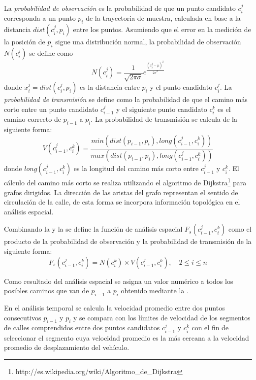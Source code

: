 La \emph{probabilidad de observación} es la probabilidad de que un punto candidato $c_{i}^{j}$ corresponda a un punto $p_i$ de la trayectoria de muestra, calculada en base a la distancia $dist(c_{i}^{j},p_i)$ entre los puntos. Asumiendo que el error en la medición de la posición de $p_i$ sigue una distribución normal, la probabilidad de observación $N(c_{i}^{j})$ se define como
\begin{equation} \label{probabilidad_de_observacion}
N(c_{i}^{j}) = \frac {1}{\sqrt { 2 \pi \sigma }} {e}^{\frac {{(x_{i}^{j} - \mu)}^{2}}{{ 2 \sigma}^{2}}}
\end{equation}
donde $x_{i}^{j} = dist(c_{i}^{j},p_i)$ es la distancia entre $p_i$ y el punto candidato $c_{i}^{j}$. 
La \emph{probabilidad de transmisión} se define como la probabilidad de que el camino más corto entre un punto candidato $c_{i-1}^{j}$ y el siguiente punto candidato $c_{i}^{k}$ es el camino correcto de $p_{i-1}$ a $p_i$. La probabilidad de transmisión se calcula de la siguiente forma: 
\begin{equation} \label{probabilidad_de_transmision}
V(c_{i-1}^{j}, c_{i}^{k}) = \frac { min( dist(p_{i-1}, p_i), long(c_{i-1}^{j}, c_{i}^{k})) }{ max (dist(p_{i-1}, p_i), long(c_{i-1}^{j}, c_{i}^{k})) }
\end{equation}
donde $long(c_{i-1}^{j}, c_{i}^{k})$ es la longitud del camino más corto entre $c_{i-1}^{j}$ y $c_{i}^{k}$. El cálculo del camino más corto se realiza utilizando el algoritmo de Dijkstra\footnote{http://es.wikipedia.org/wiki/Algoritmo\_de\_Dijkstra} para grafos dirigidos. La dirección de las aristas del grafo representan el sentido de circulación de la calle, de esta forma se incorpora información topológica en el análisis espacial.

Combinando la  y la  se define la función de análisis espacial $F_s(c_{i-1}^{j},c_{i}^{k})$ como el producto de la probabilidad de observación y la probabilidad de transmisión de la siguiente forma:
\begin{equation} \label{funcion_espacial}
F_s(c_{i-1}^{j},c_{i}^{k}) = N(c_{i}^{k}) \times V(c_{i-1}^{j}, c_{i}^{k}), \quad 2 \le i \le n 
\end{equation}

Como resultado del análisis espacial se asigna un valor numérico a todos los posibles caminos que van de $p_{i-1}$ a $p_i$ obtenido mediante la .

En el análisis temporal se calcula la velocidad promedio entre dos puntos consecutivos $p_{i-1}$ y $p_i$ y se compara con los límites de velocidad de los segmentos de calles comprendidos entre dos puntos candidatos $c_{i-1}^{j}$ y $c_{i}^{k}$ con el fin de seleccionar el segmento cuya velocidad promedio es la más cercana a la velocidad promedio de desplazamiento del vehículo.

